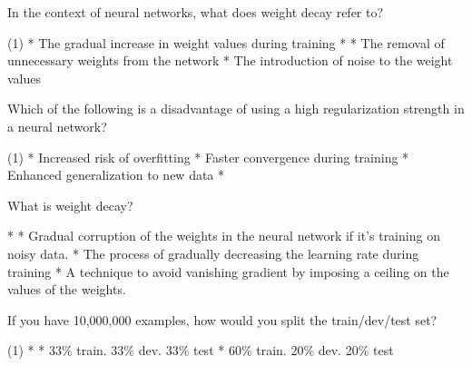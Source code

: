 \documentclass[11pt]{extarticle}
\begin{document}
\begin{exercise}
    In the context of neural networks, what does weight decay refer to?
    \begin{choice} (1)
        * The gradual increase in weight values during training
        * 
        * The removal of unnecessary weights from the network
        * The introduction of noise to the weight values
    \end{choice}
\end{exercise}
\begin{solution}
\end{solution}

\begin{exercise}
    Which of the following is a disadvantage of using a high regularization strength in a neural network?
    \begin{choice} (1)
        * Increased risk of overfitting
        * Faster convergence during training
        * Enhanced generalization to new data
        * 
    \end{choice}
\end{exercise}
\begin{solution}
\end{solution}

\begin{exercise}
    What is weight decay?
    \begin{choice}
        * 
        * Gradual corruption of the weights in the neural network if it's training on noisy data.
        * The process of gradually decreasing the learning rate during training
        * A technique to avoid vanishing gradient by imposing a ceiling on the values of the weights.
    \end{choice}
\end{exercise}
\begin{solution}
\end{solution}

\begin{exercise}
    If you have 10,000,000 examples, how would you split the train/dev/test set?
    \begin{choice}(1)
        * 
        * 33\% train. 33\% dev. 33\% test
        * 60\% train. 20\% dev. 20\% test
    \end{choice}
\end{exercise}
\begin{solution}
\end{solution}
\end{document}
